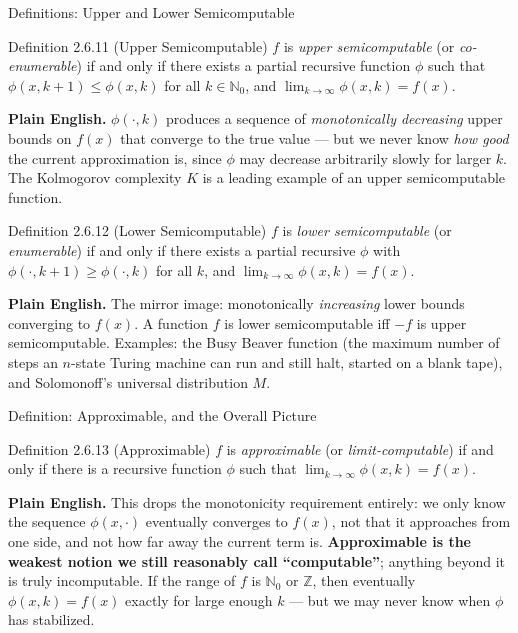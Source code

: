 \documentclass[aspectratio=169,10pt]{beamer}
\newcommand{\N}{\mathbb{N}}
\newcommand{\Z}{\mathbb{Z}}
\begin{document}
\begin{frame}{Definitions: Upper and Lower Semicomputable}
  \begin{block}{Definition 2.6.11 (Upper Semicomputable)}
    $f$ is \emph{upper semicomputable} (or \emph{co-enumerable}) if and only if
    there exists a partial recursive function $\phi$ such that
    $\phi(x,k+1) \leq \phi(x,k)$ for all $k \in \N_0$, and
    $\lim_{k \to \infty} \phi(x,k) = f(x)$.
  \end{block}
  \textbf{Plain English.} $\phi(\cdot,k)$ produces a sequence of
  \emph{monotonically decreasing} upper bounds on $f(x)$ that converge to the
  true value --- but we never know \emph{how good} the current approximation
  is, since $\phi$ may decrease arbitrarily slowly for larger $k$. The
  Kolmogorov complexity $K$ is a leading example of an upper semicomputable
  function.

  \begin{block}{Definition 2.6.12 (Lower Semicomputable)}
    $f$ is \emph{lower semicomputable} (or \emph{enumerable}) if and only if
    there exists a partial recursive $\phi$ with
    $\phi(\cdot,k+1) \geq \phi(\cdot,k)$ for all $k$, and
    $\lim_{k\to\infty} \phi(x,k) = f(x)$.
  \end{block}
  \textbf{Plain English.} The mirror image: monotonically \emph{increasing}
  lower bounds converging to $f(x)$. A function $f$ is lower semicomputable
  iff $-f$ is upper semicomputable. Examples: the Busy Beaver function (the
  maximum number of steps an $n$-state Turing machine can run and still halt,
  started on a blank tape), and Solomonoff's universal distribution $M$.
\end{frame}

\begin{frame}{Definition: Approximable, and the Overall Picture}
  \begin{block}{Definition 2.6.13 (Approximable)}
    $f$ is \emph{approximable} (or \emph{limit-computable}) if and only if
    there is a recursive function $\phi$ such that
    $\lim_{k\to\infty} \phi(x,k) = f(x)$.
  \end{block}
  \textbf{Plain English.} This drops the monotonicity requirement entirely: we
  only know the sequence $\phi(x,\cdot)$ eventually converges to $f(x)$, not
  that it approaches from one side, and not how far away the current term is.
  \textbf{Approximable is the weakest notion we still reasonably call
  ``computable''}; anything beyond it is truly incomputable. If the range of
  $f$ is $\N_0$ or $\Z$, then eventually $\phi(x,k) = f(x)$ exactly for large
  enough $k$ --- but we may never know when $\phi$ has stabilized.
\end{frame}
\end{document}
